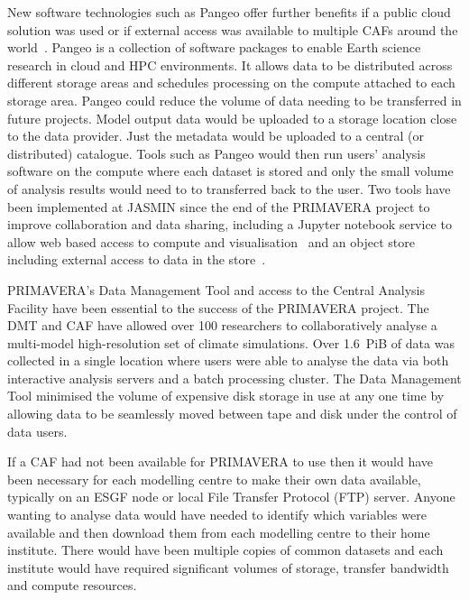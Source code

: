 \documentclass[gmd, manuscript]{copernicus}
\begin{document}
New software technologies such as Pangeo offer further benefits if a public cloud solution was used or if external access was available to multiple CAFs around the world~\citep{Pangeo}. Pangeo is a collection of software packages to enable Earth science research in cloud and HPC environments. It allows data to be distributed across different storage areas and schedules processing on the compute attached to each storage area. Pangeo could reduce the volume of data needing to be transferred in future projects. Model output data would be uploaded to a storage location close to the data provider. Just the metadata would be uploaded to a central (or distributed) catalogue. Tools such as Pangeo would then run users' analysis software on the compute where each dataset is stored and only the small volume of analysis results would need to to transferred back to the user. Two tools have been implemented at JASMIN since the end of the PRIMAVERA project to improve collaboration and data sharing, including a Jupyter notebook service to allow web based access to compute and visualisation~\citep{JasminJupyter} and an object store including external access to data in the store~\citep{JasminObjectStore}. 

\conclusions  %

PRIMAVERA's Data Management Tool and access to the Central Analysis Facility have been essential to the success of the PRIMAVERA project. The DMT and CAF have allowed over 100 researchers to collaboratively analyse a multi-model high-resolution set of climate simulations. Over 1.6~PiB of data was collected in a single location where users were able to analyse the data via both interactive analysis servers and a batch processing cluster. The Data Management Tool minimised the volume of expensive disk storage in use at any one time by allowing data to be seamlessly moved between tape and disk under the control of data users.

If a CAF had not been available for PRIMAVERA to use then it would have been necessary for each modelling centre to make their own data available, typically on an ESGF node or local File Transfer Protocol (FTP) server. Anyone wanting to analyse data would have needed to identify which variables were available and then download them from each modelling centre to their home institute. There would have been multiple copies of common datasets and each institute would have required significant volumes of storage, transfer bandwidth and compute resources.
\end{document}
